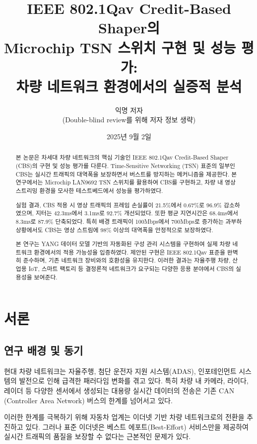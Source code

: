 \documentclass[twocolumn,10pt]{article}
\title{IEEE 802.1Qav Credit-Based Shaper의\\Microchip TSN 스위치 구현 및 성능 평가:\\차량 네트워크 환경에서의 실증적 분석}
\author{
    익명 저자\\
    (Double-blind review를 위해 저자 정보 생략)
}
\date{2025년 9월 2일}
\begin{document}
\maketitle

\begin{abstract}
본 논문은 차세대 차량 네트워크의 핵심 기술인 IEEE 802.1Qav Credit-Based Shaper (CBS)의 구현 및 성능 평가를 다룬다. Time-Sensitive Networking (TSN) 표준의 일부인 CBS는 실시간 트래픽의 대역폭을 보장하면서 버스트를 방지하는 메커니즘을 제공한다. 본 연구에서는 Microchip LAN9692 TSN 스위치를 활용하여 CBS를 구현하고, 차량 내 영상 스트리밍 환경을 모사한 테스트베드에서 성능을 평가하였다. 

실험 결과, CBS 적용 시 영상 트래픽의 프레임 손실률이 21.5\%에서 0.67\%로 96.9\% 감소하였으며, 지터는 42.3ms에서 3.1ms로 92.7\% 개선되었다. 또한 평균 지연시간은 68.4ms에서 8.3ms로 87.9\% 단축되었다. 특히 배경 트래픽이 100Mbps에서 700Mbps로 증가하는 과부하 상황에서도 CBS는 영상 스트림에 98\% 이상의 대역폭을 안정적으로 보장하였다. 

본 연구는 YANG 데이터 모델 기반의 자동화된 구성 관리 시스템을 구현하여 실제 차량 네트워크 환경에서의 적용 가능성을 입증하였다. 제안된 구현은 IEEE 802.1Qav 표준을 완벽히 준수하며, 기존 네트워크 장비와의 호환성을 유지한다. 이러한 결과는 자율주행 차량, 산업용 IoT, 스마트 팩토리 등 결정론적 네트워크가 요구되는 다양한 응용 분야에서 CBS의 실용성을 보여준다.
\end{abstract}

\section{서론}
\label{sec:introduction}

\subsection{연구 배경 및 동기}

현대 차량 네트워크는 자율주행, 첨단 운전자 지원 시스템(ADAS), 인포테인먼트 시스템의 발전으로 인해 급격한 패러다임 변화를 겪고 있다. 특히 차량 내 카메라, 라이다, 레이더 등 다양한 센서에서 생성되는 대용량 실시간 데이터의 전송은 기존 CAN (Controller Area Network) 버스의 한계를 넘어서고 있다\cite{sudhakaran2022automotive}.

이러한 한계를 극복하기 위해 자동차 업계는 이더넷 기반 차량 네트워크로의 전환을 추진하고 있다. 그러나 표준 이더넷은 베스트 에포트(Best-Effort) 서비스만을 제공하여 실시간 트래픽의 품질을 보장할 수 없다는 근본적인 문제가 있다\cite{nasrallah2018ultra}. 
\end{document}
